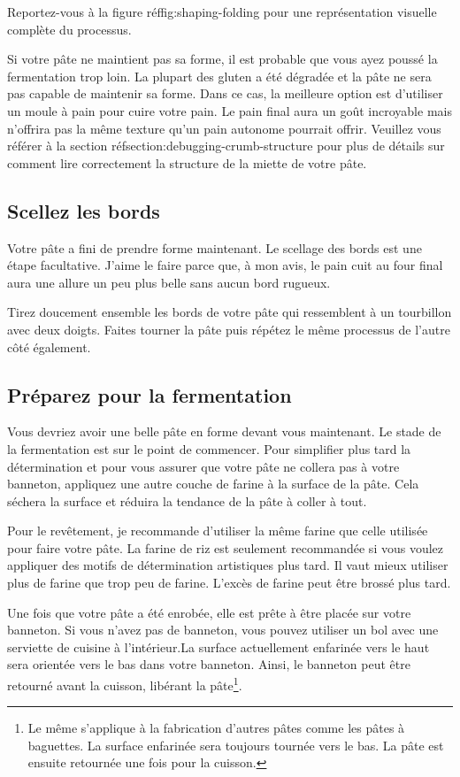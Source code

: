 Reportez-vous à la figure réf{fig:shaping-folding} pour une représentation visuelle complète
du processus.

Si votre pâte ne maintient pas sa forme, il est probable que vous ayez poussé
la fermentation trop loin. La plupart des gluten a été dégradée
et la pâte ne sera pas capable de maintenir sa forme. Dans ce cas,
la meilleure option est d'utiliser un moule à pain pour cuire votre pain. Le
pain final aura un goût incroyable mais n'offrira pas la même texture
qu'un pain autonome pourrait offrir. Veuillez vous référer à
la section réf{section:debugging-crumb-structure} pour plus
de détails sur comment lire correctement la structure de la miette de votre pâte.

\subsection[Scellage]{Scellez les bords}

Votre pâte a fini de prendre forme maintenant. Le scellage des bords
est une étape facultative. J'aime le faire parce que, à mon avis,
le pain cuit au four final aura une allure un peu plus belle sans
aucun bord rugueux.

Tirez doucement ensemble les bords de votre pâte qui ressemblent à un tourbillon
avec deux doigts. Faites tourner la pâte puis répétez le même processus
de l'autre côté également.

\subsection[Préparation pour la fermentation]{Préparez pour la fermentation}

Vous devriez avoir une belle pâte en forme devant vous maintenant.
Le stade de la fermentation est sur le point de commencer. Pour simplifier plus
tard la détermination et pour vous assurer que votre pâte ne collera pas à votre banneton,
appliquez une autre couche de farine à la surface de la pâte. Cela
séchera la surface et réduira la tendance de la pâte
à coller à tout.

Pour le revêtement, je recommande d'utiliser la même farine que celle utilisée
pour faire votre pâte. La farine de riz est seulement recommandée si vous
voulez appliquer des motifs de détermination artistiques plus tard. Il vaut mieux
utiliser plus de farine que trop peu de farine. L'excès de farine peut être
brossé plus tard.

Une fois que votre pâte a été enrobée, elle est prête à être placée sur votre banneton.
Si vous n'avez pas de banneton, vous pouvez utiliser un bol
avec une serviette de cuisine à l'intérieur.La surface actuellement enfarinée vers le haut sera orientée vers le bas dans votre banneton.
Ainsi, le banneton peut être retourné
avant la cuisson, libérant la pâte\footnote{Le même
s'applique à la fabrication d'autres pâtes comme les pâtes à baguettes. La surface enfarinée
sera toujours tournée vers le bas. La pâte est ensuite retournée
une fois pour la cuisson.}.

